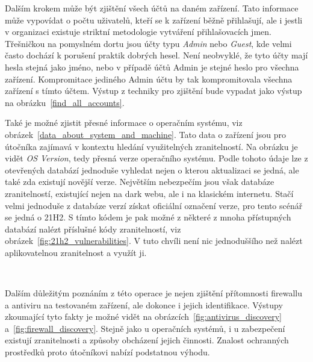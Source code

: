 Dalším krokem může být zjištění všech účtů na daném zařízení.
Tato informace může vypovídat o počtu uživatelů, kteří se k zařízení běžně přihlašují, ale i jestli v organizaci existuje striktní metodologie vytváření přihlašovacích jmen.
Třešničkou na pomyslném dortu jsou účty typu \textit{Admin} nebo \textit{Guest}, kde velmi často dochází k porušení praktik dobrých hesel.
Není neobvyklé, že tyto účty mají hesla stejná jako jméno, nebo v případě účtů Admin je stejné heslo pro všechna zařízení.
Kompromitace jediného Admin účtu by tak kompromitovala všechna zařízení s tímto účtem.
Výstup z techniky pro zjištění bude vypadat jako výstup na obrázku~\ref{find_all_accounts}.


Také je možné zjistit přesné informace o operačním systému, viz obrázek~\ref{data_about_system_and_machine}.
Tato data o zařízení jsou pro útočníka zajímavá v kontextu hledání využitelných zranitelností.
Na obrázku je vidět \textit{OS Version}, tedy přesná verze operačního systému.
Podle tohoto údaje lze z otevřených databází jednoduše vyhledat nejen o kterou aktualizaci se jedná, ale také zda existují novější verze.
Největším nebezpečím jsou však databáze zranitelností, existující nejen na dark webu, ale i na klasickém internetu.
Stačí velmi jednoduše z databáze verzí získat oficiální označení verze, pro tento scénář se jedná o 21H2\cite{win_versions}.
S tímto kódem je pak možné z některé z mnoha přístupných databází nalézt příslušné kódy zranitelností, viz obrázek~\ref{fig:21h2_vulnerabilities}.
V tuto chvíli není nic jednoduššího než nalézt aplikovatelnou zranitelnost a využít ji.

~
~

Dalším důležitým poznáním z této operace je nejen zjištění přítomnosti firewallu a antiviru na testovaném zařízení, ale dokonce i jejich identifikace.
Výstupy zkoumající tyto fakty je možné vidět na obrázcích~\ref{fig:antivirus_discovery} a~\ref{fig:firewall_discovery}.
Stejně jako u operačních systémů, i u zabezpečení existují zranitelnosti a způsoby obcházení jejich činnosti.
Znalost ochranných prostředků proto útočníkovi nabízí podstatnou výhodu.

